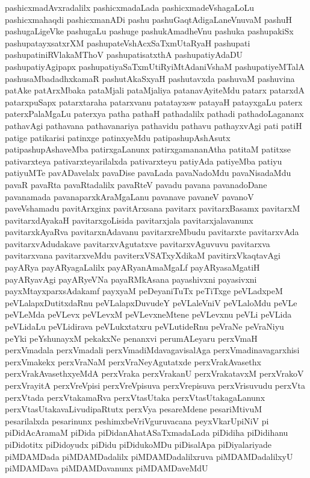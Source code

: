 {pashicxmadAvxradalilx
pashicxmadaLada
pashicxmadeVshagaLoLu
pashicxmahaqdi
pashicxmanADi
pashu
pashuGaqtAdigaLaneVnuvaM
pashuH
pashugaLigeVke
pashugaLu
pashuge
pashukAmadheVnu
pashuka
pashupakiSx
pashupatayxsatxrXM
pashupateVshAcxSaTxmUtaRyaH
pashupati
pashupatiniRVlakaMThoV
pashupatisatxthA
pashupatiyAdaDU
pashupatiyAgipapx
pashupatiyaSaTxmUtiRyiMtAdaniVshaM
pashupatiyeMTalA
pashusaMbadadhxkamaR
pashutAkaSxyaH
pashutavxda
pashuvaM
pashuvina
patAke
patArxMbaka
pataMjali
pataMjaliya
patanavAyiteMdu
patarx
patarxdA
patarxpuSapx
patarxtaraha
patarxvanu
patatayxsw
patayaH
patayxgaLu
paterx
paterxPalaMgaLu
paterxya
patha
pathaH
pathadalilx
pathadi
pathadoLagananx
pathavAgi
pathavana
pathavanariya
pathavidu
pathavu
pathayxvAgi
pati
patiH
patige
patikarisi
patinxge
patinxyeMdu
patipashupAshAsutx
patipashupAshaveMba
patirxgaLanunx
patirxgamananAtha
patitaM
patitxse
pativarxteya
pativarxteyarilalxda
pativarxteyu
patiyAda
patiyeMba
patiyu
patiyuMTe
pavADavelalx
pavaDise
pavaLada
pavaNadoMdu
pavaNisadaMdu
pavaR
pavaRta
pavaRtadalilx
pavaRteV
pavadu
pavana
pavanadoDane
pavanamada
pavanaparxkAraMgaLanu
pavanave
pavaneV
pavanoV
paveVshamadu
pavitArxginx
pavitArxsana
pavitarx
pavitarxBasamx
pavitarxM
pavitarxdAyakaH
pavitarxgoLisida
pavitarxjala
pavitarxjalavanunx
pavitarxkAyaRva
pavitarxnAdavanu
pavitarxreMbudu
pavitarxte
pavitarxvAda
pavitarxvAdudakave
pavitarxvAgutatxve
pavitarxvAguvuvu
pavitarxva
pavitarxvana
pavitarxveMdu
paviterxVSATxyXdikaM
pavitirxVkaqtavAgi
payARya
payARyagaLalilx
payARyanAmaMgaLf
payARyasaMgatiH
payARyavAgi
payARyeVNa
payaRMkAsana
payashivxni
payasivxni
payxMtayxparxsAdakamf
payxyaM
peDeyaniTuTx
peTiTxge
peVLadxpeM
peVLalapxDutitxdaRnu
peVLalapxDuvudeY
peVLaleVniV
peVLaloMdu
peVLe
peVLeMda
peVLevx
peVLevxM
peVLevxneMtene
peVLevxnu
peVLi
peVLida
peVLidaLu
peVLidirava
peVLukxtatxru
peVLutideRnu
peVraNe
peVraNiyu
peYki
peYshunayxM
pekakxNe
penanxvi
perumALeyaru
perxVmaH
perxVmadala
perxVmadali
perxVmadiMdavagavisalAga
perxVmadinavagarxhisi
perxVmakekx
perxVraNaM
perxVraNeyAgutatxde
perxVrakAvasethx
perxVrakAvasethxyeMdA
perxVraka
perxVrakanU
perxVrakatavxM
perxVrakoV
perxVrayitA
perxVreVpisi
perxVreVpisuva
perxVrepisuva
perxVrisuvudu
perxVta
perxVtada
perxVtakamaRva
perxVtasUtaka
perxVtasUtakagaLanunx
perxVtasUtakavaLivudipaRtutx
perxVya
pesareMdene
pesariMtivuM
pesarilalxda
pesarinunx
peshimxbeVriVguruvacana
peyxVkarUpiNiV
pi
piDidAcAramaM
piDida
piDidanAhatASaTxmadaLada
piDidiha
piDidihanu
piDidotitx
piDidoyudx
piDidu
piDidukoMDu
piDisalApa
piDiyalariyade
piMDAMDada
piMDAMDadalilx
piMDAMDadalilxruva
piMDAMDadalilxyU
piMDAMDava
piMDAMDavanunx
piMDAMDaveMdU
}
